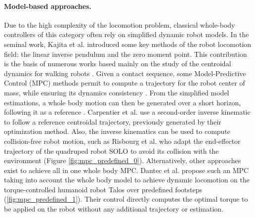 \paragraph{Model-based approaches.}
Due to the high complexity of the locomotion problem, classical whole-body controllers of this category often rely on simplified dynamic robot models.
In the seminal work, Kajita et al. \cite{kajita2003ZMP} introduced some key methods of the robot locomotion field: the linear inverse pendulum and the zero moment point.
This contribution is the basis of numerous works based mainly on the study of the centroidal dynamics for walking robots \cite{Tonneau2018_2PAC, caron_2018_whole_body}.
Given a contact sequence, some Model-Predictive Control (MPC) methods permit to compute a trajectory for the robot center of mass, while ensuring its dynamics consistency \cite{carpentier2016_versatile_efficient, pierre_alexandre_2021}.
From the simplified model estimations, a whole body motion can then be generated over a short horizon, following it as a reference \cite{felix_and_avadesh_2019}.
Carpentier et al. \cite{loco3d} use a second-order inverse kinematic to follow a reference centroidal trajectory, previously generated by their optimization method.
Also, the inverse kinematics can be used to compute collision-free robot motion, such as Risbourg et al. \cite{fanny_mip_solo} who adapt the end-effector trajectory of the quadruped robot SOLO to avoid its collision with the environment (Figure \ref{fig:mpc_predefined_0}). %
Alternatively, other approaches exist to achieve all in one whole body MPC. Dantec et al. \cite{ewen_2022} propose such an MPC taking into account the whole body model to achieve dynamic locomotion on the torque-controlled humanoid robot Talos over predefined footsteps (\ref{fig:mpc_predefined_1}). Their control directly computes the optimal torque to be applied on the robot without any additional trajectory or estimation.



